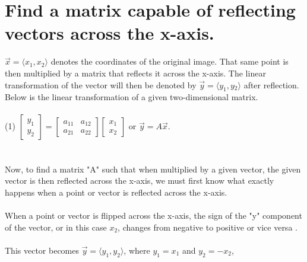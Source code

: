 \maketitle

\section{\LARGE
 Find a matrix capable of reflecting vectors across the x-axis. }
$\vec{x} = \langle{x{_1}},x{_2}\rangle$ denotes the coordinates of the original image. That same point is then multiplied by a matrix that reflects it across the x-axis. The linear transformation of the vector will then be denoted by 
$\vec{y} = \langle{y_{1}},y{_2}\rangle$ after reflection. Below is the linear transformation of a given two-dimensional matrix. \\\\
(1) $\left[\begin{array}{c}
y_{1}\\ y_{2}\end{array} \right]=$$\left[\begin{array}{cc}
a_{11} & a_{12} \\ a_{21} & a_{22} \end{array}\right]$$\left[\begin{array}{c} x_1 \\ x_2\end{array}\right]$ or $\vec{y} = A\vec{x}$.
\\\\\\Now, to find a matrix "A" such that when multiplied by a given vector, the given vector is then reflected across the x-axis, we must first know what exactly happens when a point or vector is reflected across the x-axis.
\\\\When a point or vector is flipped across the x-axis, the sign of the "y" component of the vector, or in this case $x_2$, changes from negative to positive or vice versa
.\\\\This vector becomes $\vec{y} = \langle{y_1}, y_2\rangle$, where $y_1 = x_1$ and $y_2 =-x_2$,\\

